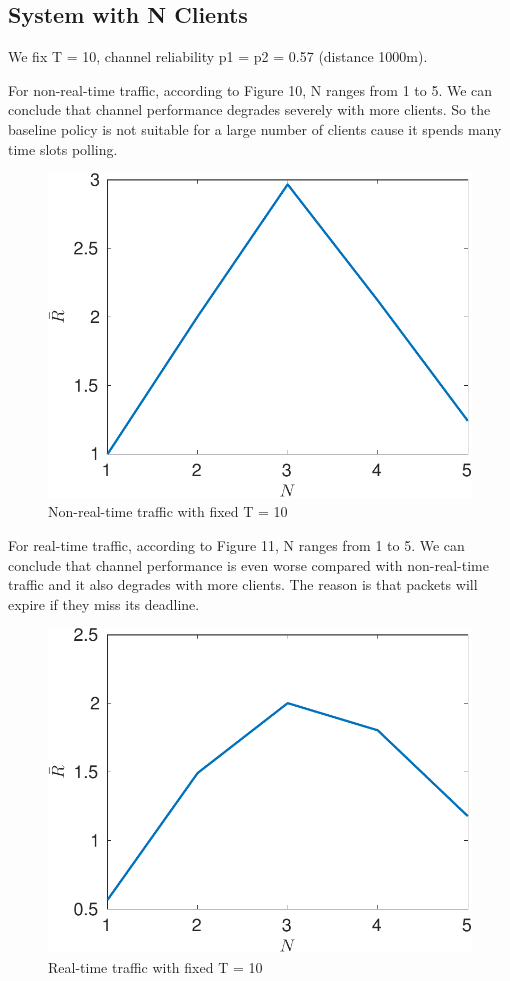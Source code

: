 \documentclass{article}
\begin{document}
\subsection{System with N Clients}
We fix T = 10, channel reliability p1 = p2 = 0.57 (distance 1000m).

For non-real-time traffic, according to Figure 10, N ranges from 1 to 5. We can conclude that channel performance degrades severely with more clients. So the baseline policy is not suitable for a large number of clients cause it spends many time slots polling. 

\begin{figure}[H]
\centering
\includegraphics[scale=0.7]{nonrealtime_throughput_N.pdf}
\caption{Non-real-time traffic with fixed T = 10}
\end{figure}

For real-time traffic, according to Figure 11, N ranges from 1 to 5. We can conclude that channel performance is even worse compared with non-real-time traffic and it also degrades with more clients. The reason is that packets will expire if they miss its deadline.  

\begin{figure}[H]
\centering
\includegraphics[scale=0.7]{realtime_throughput_N.pdf}
\caption{Real-time traffic with fixed T = 10}
\end{figure}
\end{document}
